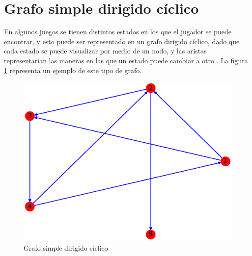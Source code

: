 \documentclass{article}
\begin{document}
\section{Grafo simple dirigido cíclico}
En algunos juegos se tienen distintos estados en los que el jugador se puede encontrar, y esto puede ser representado en un grafo dirigido cíclico, dado que cada estado se puede visualizar por medio de un nodo, y las aristas representarían las maneras en las que un estado puede cambiar a otro \cite{GSDA}. La figura \ref{fig:GSDC} representa un ejemplo de este tipo de grafo.
\begin{figure}[h!]
    \includegraphics[width=\textwidth]{5-GSDC}
    \caption{Grafo simple dirigido cíclico}
    \label{fig:GSDC}
\end{figure}



\end{document}
